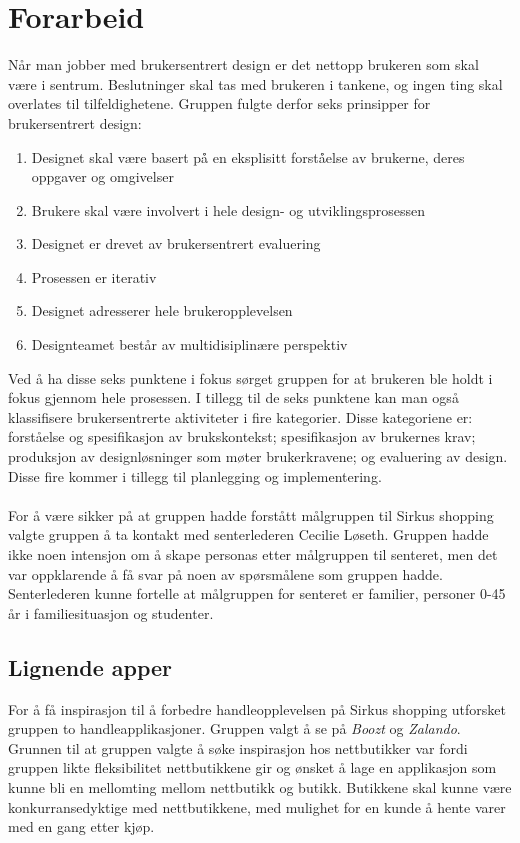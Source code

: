 \section{\textcolor[HTML]{D32F2F}{Forarbeid}}

Når man jobber med brukersentrert design er det nettopp brukeren som skal være i sentrum. Beslutninger skal tas med brukeren i tankene, og ingen ting skal overlates til tilfeldighetene. Gruppen fulgte derfor seks prinsipper for brukersentrert design:
\begin{enumerate}
    \item Designet skal være basert på̊ en eksplisitt forstå̊else av brukerne, deres oppgaver og omgivelser
    \item Brukere skal være involvert i hele design- og utviklingsprosessen
    \item Designet er drevet av brukersentrert evaluering
    \item Prosessen er iterativ
    \item Designet adresserer hele brukeropplevelsen
    \item Designteamet består av multidisiplinære perspektiv
\end{enumerate}

\noindent Ved å ha disse seks punktene i fokus sørget gruppen for at brukeren ble holdt i fokus gjennom hele prosessen. I tillegg til de seks punktene kan man også klassifisere brukersentrerte aktiviteter i fire kategorier. Disse kategoriene er: forståelse og spesifikasjon av brukskontekst; spesifikasjon av brukernes krav; produksjon av designløsninger som møter brukerkravene; og evaluering av design. Disse fire kommer i tillegg til planlegging og implementering.
\\\\
For å være sikker på at gruppen hadde forstått målgruppen til Sirkus shopping valgte gruppen å ta kontakt med senterlederen Cecilie Løseth. Gruppen hadde ikke noen intensjon om å skape personas etter målgruppen til senteret, men det var oppklarende å få svar på noen av spørsmålene som gruppen hadde. Senterlederen kunne fortelle at målgruppen for senteret er familier, personer 0-45 år i familiesituasjon og studenter.

\subsection{Lignende apper}
\label{lignendeApper}
For å få inspirasjon til å forbedre handleopplevelsen på Sirkus shopping utforsket gruppen to handleapplikasjoner. Gruppen valgt å se på \textit{Boozt} og \textit{Zalando}. Grunnen til at gruppen valgte å søke inspirasjon hos nettbutikker var fordi gruppen likte fleksibilitet nettbutikkene gir og ønsket å lage en applikasjon som kunne bli en mellomting mellom nettbutikk og butikk. Butikkene skal kunne være konkurransedyktige med nettbutikkene, med mulighet for en kunde å hente varer med en gang etter kjøp.

